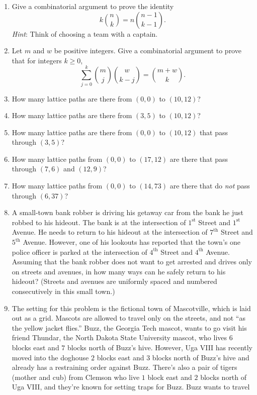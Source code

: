 \begin{enumerate}
  \item Give a combinatorial argument to prove the identity
    \[k\binom{n}{k} = n\binom{n-1}{k-1}.\] \textit{Hint}: Think of
    choosing a team with a captain.
  \item Let $m$ and $w$ be positive integers. Give a combinatorial
    argument to prove that for integers $k\geq 0$,
    \[\sum_{j=0}^k \binom{m}{j}\binom{w}{k-j} = \binom{m+w}{k}.\]
  \item How many lattice paths are there from $(0,0)$ to $(10,12)$?
  \item How many lattice paths are there from $(3,5)$ to $(10,12)$?
  \item How many lattice paths are there from $(0,0)$ to $(10,12)$
    that pass through $(3,5)$?
  \item How many lattice paths from $(0,0)$ to $(17,12)$ are there
    that pass through $(7,6)$ and $(12,9)$?
  \item How many lattice paths from $(0,0)$ to $(14,73)$ are there
    that do \textit{not} pass through $(6,37)$?
  \item A small-town bank robber is driving his getaway car from the
    bank he just robbed to his hideout. The bank is at the
    intersection of $1^\text{st}$ Street and $1^\text{st}$ Avenue. He
    needs to return to his hideout at the intersection of
    $7^\text{th}$ Street and $5^\text{th}$ Avenue. However, one of his
    lookouts has reported that the town's one police officer is parked
    at the intersection of $4^\text{th}$ Street and $4^\text{th}$
    Avenue. Assuming that the bank robber does not want to get
    arrested and drives only on streets and avenues, in how many ways
    can he safely return to his hideout?  (Streets and avenues are
    uniformly spaced and numbered consecutively in this small town.)
  \item The setting for this problem is the fictional town of
    Mascotville, which is laid out as a grid. Mascots are allowed to
    travel only on the streets, and not ``as the yellow jacket
    flies.''  Buzz, the Georgia Tech mascot, wants to go visit his
    friend Thundar, the North Dakota State University mascot, who
    lives $6$ blocks east and $7$ blocks north of Buzz's
    hive. However, Uga VIII has recently moved into the doghouse $2$
    blocks east and $3$ blocks north of Buzz's hive and already has a
    restraining order against Buzz. There's also a pair of tigers (mother
    and cub) from
    Clemson who live $1$ block east and $2$ blocks north of Uga VIII,
    and they're known for setting traps for Buzz. Buzz wants to travel

\end{enumerate}
